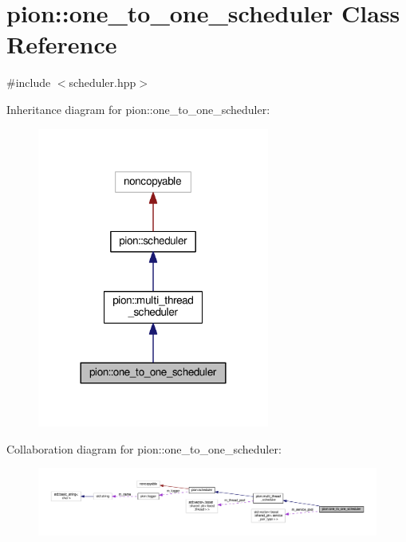 \hypertarget{classpion_1_1one__to__one__scheduler}{\section{pion\-:\-:one\-\_\-to\-\_\-one\-\_\-scheduler Class Reference}
\label{classpion_1_1one__to__one__scheduler}
}


{\ttfamily \#include $<$scheduler.\-hpp$>$}



Inheritance diagram for pion\-:\-:one\-\_\-to\-\_\-one\-\_\-scheduler\-:
\nopagebreak
\begin{figure}[H]
\begin{center}
\leavevmode
\includegraphics[width=216pt]{classpion_1_1one__to__one__scheduler__inherit__graph}
\end{center}
\end{figure}


Collaboration diagram for pion\-:\-:one\-\_\-to\-\_\-one\-\_\-scheduler\-:
\nopagebreak
\begin{figure}[H]
\begin{center}
\leavevmode
\includegraphics[width=350pt]{classpion_1_1one__to__one__scheduler__coll__graph}
\end{center}
\end{figure}
